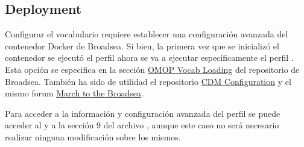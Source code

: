 \subsection{Deployment}

Configurar el vocabulario requiere establecer una configuración avanzada del contenedor Docker de Broadsea. Si bien, la primera vez que se inicializó el contenedor se ejecutó el perfil  ahora se va a ejecutar específicamente el perfil . Esta opción se especifica en la sección \href{https://github.com/OHDSI/Broadsea?tab=readme-ov-file#omop-vocab-loading}{OMOP Vocab Loading} del repositorio de Broadsea. También ha sido de utilidad el repositorio \href{https://github.com/OHDSI/WebAPI/wiki/CDM-Configuration}{CDM Configuration} y el mismo forum \href{https://forums.ohdsi.org/t/march-to-the-broadsea/20576}{March to the Broadsea}.

Para acceder a la información y configuración avanzada del perfil se puede acceder al  y a la sección 9 del archivo , aunque este caso no será necesario realizar ninguna modificación sobre los mismos.

